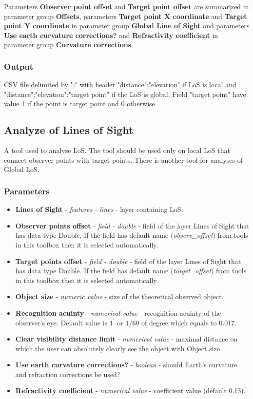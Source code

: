 \documentclass[]{article}
\begin{document}
Parameters \textbf{Observer point offset} and \textbf{Target point offset} are summarized in parameter group \textbf{Offsets}, parameters \textbf{Target point X coordinate} and \textbf{Target point Y coordinate} in parameter group \textbf{Global Line of Sight} and parameters \textbf{Use earth curvature corrections?} and \textbf{Refractivity coefficient} in parameter group \textbf{Curvature corrections}.

\subsubsection{Output}

CSV file delimited by ";" with header "distance";"elevation" if LoS is local and "distance";"elevation";"target point"  if the LoS is global. Field "target point" have value 1 if the point is target point and 0 otherwise.

\subsection{Analyze of Lines of Sight}

A tool used to analyse LoS. The tool should be used only on local LoS that connect observer points with target points. There is another tool for analyses of Global LoS.

\subsubsection{Parameters}
\begin{itemize}
	\item \textbf{Lines of Sight} - \textit{features - lines} - layer containing LoS.
	\item \textbf{Observer points offset} - \textit{field - double} - field of the layer Lines of Sight that has data type Double. If the field has default name (\textit{observ\_offset}) from tools in this toolbox then it is selected automatically.
	\item \textbf{Target points offset} - \textit{field - double} - field of the layer Lines of Sight that has data type Double. If the field has default name (\textit{target\_offset}) from tools in this toolbox then it is selected automatically.
	\item \textbf{Object size} - \textit{numeric value} - size of the theoretical observed object.
	\item \textbf{Recognition acuinty} - \textit{numerical value} - recognition acuinty of the observer's eye. Default value is $1^\prime$ or $1/60$ of degree which equals to 0.017. 
	\item \textbf{Clear visibility distance limit} - \textit{numerical value} - maximal distance on which the user can absolutely clearly see the object with Object size.
	\item \textbf{Use earth curvature corrections?} - \textit{boolean} - should Earth's curvature and refraction corrections be used?
	\item \textbf{Refractivity coefficient} - \textit{numerical value}  - coefficient value (default 0.13).
\end{itemize}
\end{document}
